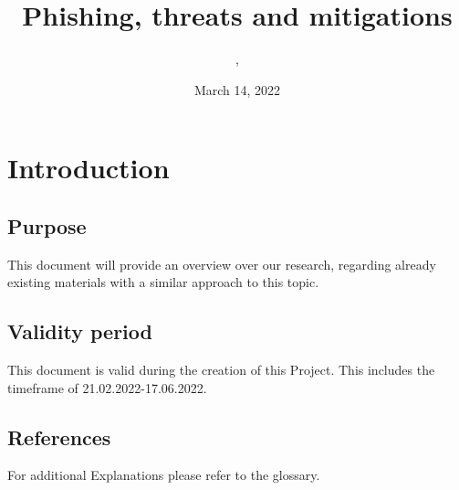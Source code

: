 \documentclass{../../../extra/styles/SecureRole}
\title{Phishing, threats and mitigations}
\author{\Ba, \Wi}
\date{March 14, 2022}
\begin{document}
\makecover
\newpage

\tableofcontents
\newpage

\chapter{Introduction}

\section{Purpose}

This document will provide an overview over our research, regarding already existing materials with a similar approach to this topic.

\section{Validity period}

This document is valid during the creation of this Project.
\newline
This includes the timeframe of 21.02.2022-17.06.2022.

\section{References}

For additional Explanations please refer to the glossary.



\end{document}

